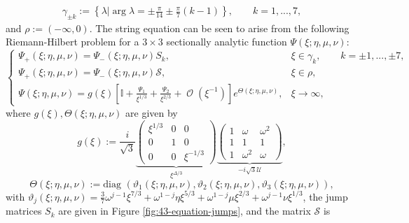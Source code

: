 \documentclass[usenames,dvipsnames]{article}
\theoremstyle{definition}
\DeclareMathOperator{\OO}{\mathcal{O}}
\numberwithin{equation}{section}
\numberwithin{figure}{section}
\begin{document}
\begin{align*}
        \gamma_{\pm k} := \left\{\lambda \big| \arg \lambda = \pm \frac{\pi}{14} \pm \frac{\pi}{7}(k-1) \right\}, \qquad k = 1,...,7,
    \end{align*}
and $\rho := (-\infty,0)$. The string equation can be seen to arise from the following Riemann-Hilbert problem for a $3\times 3$ 
sectionally analytic function $\Psi(\xi;\eta,\mu,\nu)$:
    \begin{equation}
            \begin{cases}
                \Psi_{+}(\xi;\eta,\mu,\nu) =  \Psi_{-}(\xi;\eta,\mu,\nu) S_k, & \xi \in \gamma_k,\qquad k = \pm 1, ...,\pm 7,\\
                \Psi_{+}(\xi;\eta,\mu,\nu) =  \Psi_{-}(\xi;\eta,\mu,\nu) \mathcal{S}, & \xi \in \rho,\\
                \Psi(\xi;\eta,\mu,\nu) = g(\xi)\left[\mathbb{I} + \frac{\Psi_1}{\xi^{1/3}} + \frac{\Psi_2}{\xi^{2/3}} + \OO(\xi^{-1})\right]e^{\Theta(\xi;\eta,\mu,\nu)}, & \xi \to \infty,
            \end{cases}
        \end{equation}
    where $g(\xi), \Theta(\xi;\eta,\mu,\nu)$ are given by
\begin{equation}\label{gauge-matrix}
        g(\xi) := 
        \frac{i}{\sqrt{3}}\underbrace{\begin{pmatrix}
            \xi^{1/3} & 0 & 0\\
            0 & 1 & 0\\
            0 & 0 & \xi^{-1/3}
        \end{pmatrix}}_{\xi^{\Delta/3}}
        \underbrace{\begin{pmatrix}
            1 & \omega & \omega^2\\
            1 & 1 & 1\\
            1 & \omega^2 & \omega
        \end{pmatrix}}_{-i\sqrt{3}\mathcal{U}},
    \end{equation}
    \begin{equation}
        \Theta(\xi;\eta,\mu,\nu) := \text{diag }(\vartheta_1(\xi;\eta,\mu,\nu),\vartheta_2(\xi;\eta,\mu,\nu),\vartheta_3(\xi;\eta,\mu,\nu)),
    \end{equation}
with $\vartheta_j(\xi;\eta,\mu,\nu) = \frac{3}{7}\omega^{j-1}\xi^{7/3} + \omega^{1-j}\eta\xi^{5/3} + \omega^{1-j}\mu\xi^{2/3} + \omega^{j-1}\nu\xi^{1/3}$, the jump matrices $S_k$ are given in Figure \eqref{fig:43-equation-jumps}, and the matrix $\mathcal{S}$ is
\end{document}

